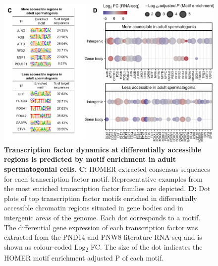 \documentclass[12pt,twoside]{reedthesis}
\begin{document}
\begin{subfigures}
\begin{figure}[htbp]
{\centering \includegraphics{thesis_files/figure-latex/df4b-1} 

}

\caption[Transcription factor dynamics at differentially accessible regions is predicted by motif enrichment in adult spermatogonial cells]{\textbf{Transcription factor dynamics at differentially accessible regions is predicted by motif enrichment in adult spermatogonial cells.} \newline \textbf{C:} HOMER extracted consensus sequences for each transcription factor motif. Representative examples from the most enriched transcription factor families are depicted. \newline \textbf{D:} Dot plots of top transcription factor motifs enriched in differentially accessible chromatin regions situated in gene bodies and in intergenic areas of the genome. Each dot corresponds to a motif. The differential gene expression of each transcription factor was extracted from the PND14 and PNW8 literature RNA-seq and is shown as colour-coded Log\textsubscript{2} FC. The size of the dot indicates the HOMER motif enrichment adjusted P of each motif.}\label{fig:df4b}
\end{figure}
\end{subfigures}
\end{document}
